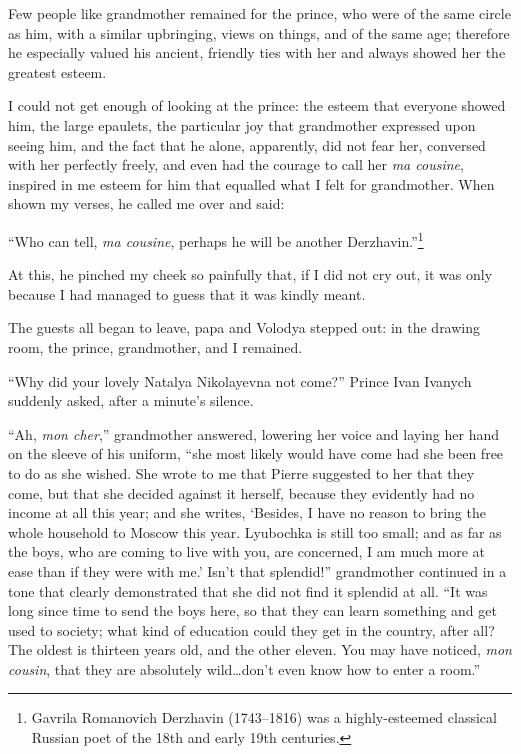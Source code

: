 Few people like grandmother remained for the prince, who were of the same circle as him, with a similar upbringing, views on things, and of the same age; therefore he especially valued his ancient, friendly ties with her and always showed her the greatest esteem.

I could not get enough of looking at the prince: the esteem that everyone showed him, the large epaulets, the particular joy that grandmother expressed upon seeing him, and the fact that he alone, apparently, did not fear her, conversed with her perfectly freely, and even had the courage to call her \textit{ma cousine}, inspired in me esteem for him that equalled what I felt for grandmother. When shown my verses, he called me over and said:

``Who can tell, \textit{ma cousine}, perhaps he will be another Derzhavin.''\footnote{Gavrila Romanovich Derzhavin (1743--1816) was a highly-esteemed classical Russian poet of the 18th and early 19th centuries.} %

At this, he pinched my cheek so painfully that, if I did not cry out, it was only because I had managed to guess that it was kindly meant.

The guests all began to leave, papa and Volodya stepped out: in the drawing room, the prince, grandmother, and I remained.

``Why did your lovely Natalya Nikolayevna not come?'' Prince Ivan Ivanych suddenly asked, after a minute's silence. %

``Ah, \textit{mon cher},'' grandmother answered, lowering her voice and laying her hand on the sleeve of his uniform, ``she most likely would have come had she been free to do as she wished. She wrote to me that Pierre suggested to her that they come, but that she decided against it herself, because they evidently had no income at all this year; and she writes, `Besides, I have no reason to bring the whole household to Moscow this year. Lyubochka is still too small; and as far as the boys, who are coming to live with you, are concerned, I am much more at ease than if they were with me.' Isn't that splendid!'' grandmother continued in a tone that clearly demonstrated that she did not find it splendid at all. ``It was long since time to send the boys here, so that they can learn something and get used to society; what kind of education could they get in the country, after all? The oldest is thirteen years old, and the other eleven. You may have noticed, \textit{mon cousin}, that they are absolutely wild\ldots{}don't even know how to enter a room.'' %

